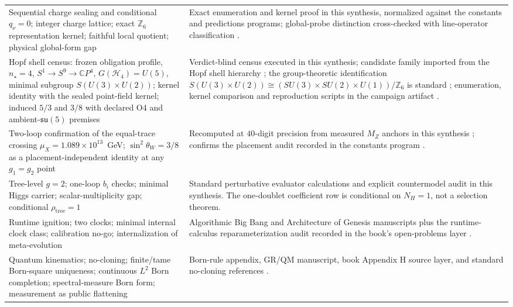 \documentclass[11pt]{article}
\theoremstyle{plain}
\theoremstyle{definition}
\theoremstyle{remark}
\newcommand{\C}{\mathbb{C}}
\newcommand{\SM}{SU(3)\times SU(2)\times U(1)}
\begin{document}
\begin{longtable}{@{}>{\raggedright\arraybackslash}p{}>{\raggedright\arraybackslash}p{}@{}}
Sequential charge sealing and conditional \(q_\nu=0\); integer charge lattice; exact \(\mathbb Z_6\) representation kernel; faithful local quotient; physical global-form gap
& Exact enumeration and kernel proof in this synthesis, normalized against the constants and predictions programs; global-probe distinction cross-checked with line-operator classification \cite{lande-constants,tong-lines}. \\
Hopf shell census: frozen obligation profile, \(n_\star=4\), \(S^1\to S^9\to\C P^4\), \(G(\mathcal H_4)=U(5)\), minimal subgroup \(S(U(3)\times U(2))\); kernel identity with the sealed point-field kernel; induced \(5/3\) and \(3/8\) with declared O4 and ambient-\(\mathfrak{su}(5)\) premises
& Verdict-blind census executed in this synthesis; candidate family imported from the Hopf shell hierarchy \cite{nielsen-hopf}; the group-theoretic identification \(S(U(3)\times U(2))\cong(\SM)/\mathbb Z_6\) is standard \cite{baez-huerta}; enumeration, kernel comparison and reproduction scripts in the campaign artifact \cite{lande-hopf-audit}. \\
Two-loop confirmation of the equal-trace crossing \(\mu_X=1.089\times10^{13}\)~GeV; \(\sin^2\theta_W=3/8\) as a placement-independent identity at any \(g_1=g_2\) point
& Recomputed at \(40\)-digit precision from measured \(M_Z\) anchors in this synthesis \cite{lande-hopf-audit}; confirms the placement audit recorded in the constants program \cite{lande-constants}. \\
Tree-level \(g=2\); one-loop \(b_i\) checks; minimal Higgs carrier; scalar-multiplicity gap; conditional \(\rho_{\mathrm{tree}}=1\)
& Standard perturbative evaluator calculations and explicit countermodel audit in this synthesis. The one-doublet coefficient row is conditional on \(N_H=1\), not a selection theorem. \\
Runtime ignition; two clocks; minimal internal clock class; calibration no-go; internalization of meta-evolution
& Algorithmic Big Bang and Architecture of Genesis manuscripts plus the runtime-calculus reparameterization audit recorded in the book's open-problems layer \cite{lande-bigbang,lande-architecture,lande-book-appendices}. \\
Quantum kinematics; no-cloning; finite/tame Born-square uniqueness; continuous \(L^2\) Born completion; spectral-measure Born form; measurement as public flattening
& Born-rule appendix, GR/QM manuscript, book Appendix H source layer, and standard no-cloning references \cite{lande-born-rule,lande-grqm,lande-book-appendices,wootters-zurek,dieks}. \\

\end{longtable}
\end{document}
